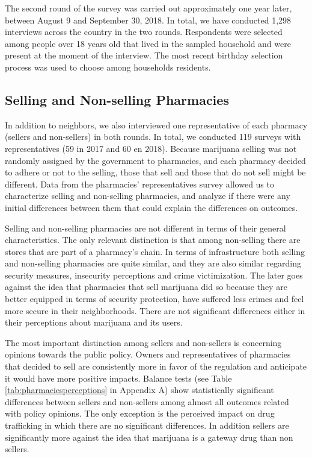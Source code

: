 \documentclass[11pt]{article}
\begin{document}
The second round of the survey was carried out approximately one year later, between August 9 and September 30, 2018. In total, we have conducted 1,298 interviews across the country in the two rounds. Respondents were selected among people over 18 years old that lived in the sampled household and were present at the moment of the interview. The most recent birthday selection process was used to choose among households residents.

\subsection{Selling and Non-selling Pharmacies}
In addition to neighbors, we also interviewed one representative of each pharmacy (sellers and non-sellers) in both rounds. In total, we conducted 119 surveys with representatives (59 in 2017 and 60 en 2018). Because marijuana selling was not randomly assigned by the government to pharmacies, and each pharmacy decided to adhere or not to the selling, those that sell and those that do not sell might be different. Data from the pharmacies' representatives survey allowed us to characterize selling and non-selling pharmacies, and analyze if there were any initial differences between them that could explain the differences on outcomes.

Selling and non-selling pharmacies are not different in terms of their general characteristics. The only relevant distinction is that among non-selling there are stores that are part of a pharmacy's chain. In terms of infrastructure both selling and non-selling pharmacies are quite similar, and they are also similar regarding security measures, insecurity perceptions and crime victimization. The later goes against the idea that pharmacies that sell marijuana did so because they are better equipped in terms of security protection, have suffered less crimes and feel more secure in their neighborhoods. There are not significant differences either in their perceptions about marijuana and its users. 

The most important distinction among sellers and non-sellers is concerning opinions towards the public policy. Owners and representatives of pharmacies that decided to sell are consistently more in favor of the regulation and anticipate it would have more positive impacts. Balance tests (see Table \ref{tab:pharmaciesperceptions} in Appendix A) show statistically significant differences between sellers and non-sellers among almost all outcomes related with policy opinions. The only exception is the perceived impact on drug trafficking in which there are no significant differences. In addition sellers are significantly more against the idea that marijuana is a gateway drug than non sellers. 
\end{document}
